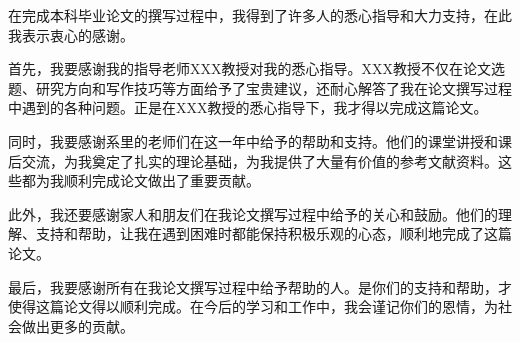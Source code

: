 在完成本科毕业论文的撰写过程中，我得到了许多人的悉心指导和大力支持，在此我表示衷心的感谢。

首先，我要感谢我的指导老师XXX教授对我的悉心指导。XXX教授不仅在论文选题、研究方向和写作技巧等方面给予了宝贵建议，还耐心解答了我在论文撰写过程中遇到的各种问题。正是在XXX教授的悉心指导下，我才得以完成这篇论文。

同时，我要感谢系里的老师们在这一年中给予的帮助和支持。他们的课堂讲授和课后交流，为我奠定了扎实的理论基础，为我提供了大量有价值的参考文献资料。这些都为我顺利完成论文做出了重要贡献。

此外，我还要感谢家人和朋友们在我论文撰写过程中给予的关心和鼓励。他们的理解、支持和帮助，让我在遇到困难时都能保持积极乐观的心态，顺利地完成了这篇论文。

最后，我要感谢所有在我论文撰写过程中给予帮助的人。是你们的支持和帮助，才使得这篇论文得以顺利完成。在今后的学习和工作中，我会谨记你们的恩情，为社会做出更多的贡献。

